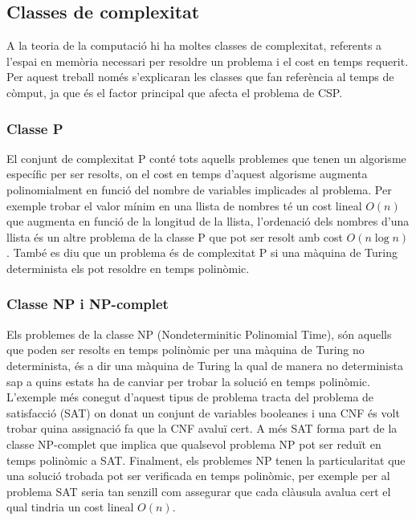 \subsection{Classes de complexitat}
A la teoria de la computació hi ha moltes classes de complexitat, referents a l'espai en memòria necessari per resoldre un problema i el cost en temps requerit. Per aquest treball només s'explicaran les classes que fan referència al temps de còmput, ja que és el factor principal que afecta el problema de CSP.

\subsubsection{Classe P}
El conjunt de complexitat P conté tots aquells problemes que tenen un algorisme específic per ser resolts, on el cost en temps d'aquest algorisme augmenta polinomialment en funció del nombre de variables implicades al problema. Per exemple trobar el valor mínim en una llista de nombres té un cost lineal $O(n)$ que augmenta en funció de la longitud de la llista, l'ordenació dels nombres d'una llista és un altre problema de la classe P que pot ser resolt amb cost $O(n\log{}n)$ . També es diu que un problema és de complexitat P si una màquina de Turing determinista els pot resoldre en temps polinòmic.

\subsubsection{Classe NP i NP-complet} \label{np and np-completeness}
Els problemes de la classe NP (Nondeterminitic Polinomial Time), són aquells que poden ser resolts en temps polinòmic per una màquina de Turing no determinista, és a dir una màquina de Turing la qual de manera no determinista sap a quins estats ha de canviar per trobar la solució en temps polinòmic. L'exemple més conegut d'aquest tipus de problema tracta del problema de satisfacció (SAT) on donat un conjunt de variables booleanes i una CNF és volt trobar quina assignació fa que la CNF avaluï cert. A més SAT forma part de la classe NP-complet que implica que qualsevol problema NP pot ser reduït en temps polinòmic a SAT. Finalment, els problemes NP tenen la particularitat que una solució trobada pot ser verificada en temps polinòmic, per exemple per al problema SAT seria tan senzill com assegurar que cada clàusula avalua cert el qual tindria un cost lineal $O(n)$.


